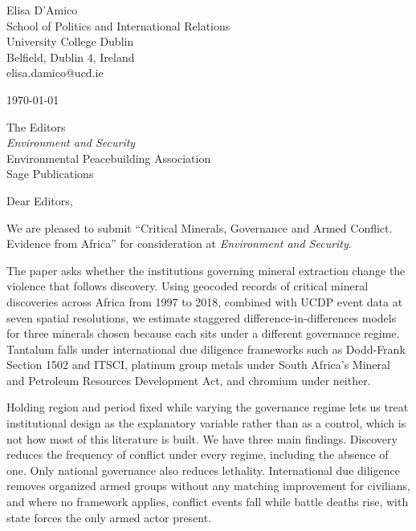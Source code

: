 \documentclass[11pt]{article}
\begin{document}
\noindent Elisa D'Amico \\
School of Politics and International Relations \\
University College Dublin \\
Belfield, Dublin 4, Ireland \\
elisa.damico@ucd.ie

\vspace{1.5em}

\noindent \today

\vspace{1.5em}

\noindent The Editors \\
\textit{Environment and Security} \\
Environmental Peacebuilding Association \\
Sage Publications

\vspace{1.5em}

\noindent Dear Editors,

We are pleased to submit ``Critical Minerals, Governance and Armed Conflict.
Evidence from Africa'' for consideration at \textit{Environment and Security}.

The paper asks whether the institutions governing mineral extraction change the
violence that follows discovery. Using geocoded records of critical mineral
discoveries across Africa from 1997 to 2018, combined with UCDP event data at
seven spatial resolutions, we estimate staggered difference-in-differences models
for three minerals chosen because each sits under a different governance regime.
Tantalum falls under international due diligence frameworks such as Dodd-Frank
Section 1502 and ITSCI, platinum group metals under South Africa's Mineral and
Petroleum Resources Development Act, and chromium under neither.

Holding region and period fixed while varying the governance regime lets us treat
institutional design as the explanatory variable rather than as a control, which
is not how most of this literature is built. We have three main findings. Discovery
reduces the frequency of conflict under every regime, including the absence of
one. Only national governance also reduces lethality. International due diligence
removes organized armed groups without any matching improvement for civilians,
and where no framework applies, conflict events fall while battle deaths rise,
with state forces the only armed actor present.
\end{document}
